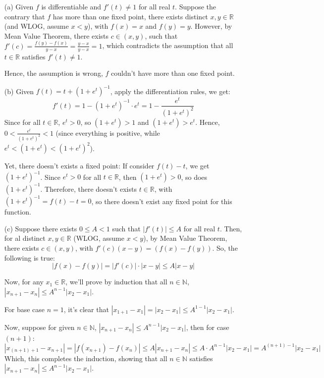 \documentclass{article}
\begin{document}
\begin{itemize}
    \item[(a)] Given $f$ is differentiable and $f'(t)\neq 1$ for all real $t$. Suppose the contrary that $f$ has more than one fixed point,
    there exists distinct $x,y\in\mathbb{R}$ (and WLOG, assume $x<y$), with $f(x)=x$ and $f(y)=y$. However, by Mean Value Theorem, there exists $c\in (x,y)$, such that $f'(c)=\frac{f(y)-f(x)}{y-x}=\frac{y-x}{y-x}=1$,
    which contradicts the assumption that all $t\in\mathbb{R}$ satisfies $f'(t)\neq 1$.

    Hence, the assumption is wrong, $f$ couldn't have more than one fixed point.

    \hfil

    \item[(b)] Given $f(t)=t+(1+e^t)^{-1}$, apply the differentiation rules, we get:
    $$f'(t)=1-(1+e^t)^{-1}\cdot e^t = 1-\frac{e^t}{(1+e^t)^2}$$
    Since for all $t\in\mathbb{R}$, $e^t>0$, so $(1+e^t)>1$ and $(1+e^t)>e^t$. Hence, $0<\frac{e^t}{(1+e^t)^2}<1$ (since everything is positive, while $e^t<(1+e^t)<(1+e^t)^2$).

    Yet, there doesn't exists a fixed point: If consider $f(t)-t$, we get $(1+e^t)^{-1}$. Since $e^t>0$ for all $t\in\mathbb{R}$, then $(1+e^t)>0$, so does $(1+e^t)^{-1}$. Therefore, there doesn't exists $t\in\mathbb{R}$, 
    with $(1+e^t)^{-1} = f(t)-t=0$, so there doesn't exist any fixed point for this function.

    \hfil

    \item[(c)] Suppose there exists $0\leq A<1$ such that $|f'(t)|\leq A$ for all real $t$. Then, for al distinct $x,y\in\mathbb{R}$ (WLOG, assume $x<y$), by Mean Value Theorem,
    there exists $c\in (x,y)$, with $f'(c)(x-y)=(f(x)-f(y))$. So, the following is true:
    $$|f(x)-f(y)| = |f'(c)|\cdot |x-y|\leq A|x-y|$$

    \hfil

    Now, for any $x_1\in\mathbb{R}$, we'll prove by induction that all $n\in\mathbb{N}$, $|x_{n+1}-x_n|\leq A^{n-1}|x_2-x_1|$.

    For base case $n=1$, it's clear that $|x_{1+1}-x_1| = |x_2-x_1| \leq A^{1-1}|x_2-x_1|$.

    Now, suppose for given $n\in\mathbb{N}$, $|x_{n+1}-x_n|\leq A^{n-1}|x_2-x_1|$, then for case $(n+1)$:
    $$|x_{(n+1)+1}-x_{n+1}| = |f(x_{n+1})-f(x_n)| \leq A|x_{n+1}-x_n| \leq A\cdot A^{n-1}|x_2-x_1| = A^{(n+1)-1}|x_2-x_1|$$
    Which, this completes the induction, showing that all $n\in\mathbb{N}$ satisfies $|x_{n+1}-x_n|\leq A^{n-1}|x_2-x_1|$.


\end{itemize}
\end{document}
